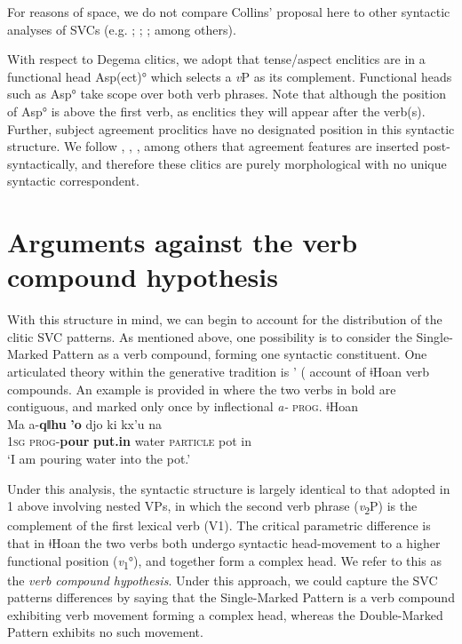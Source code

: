 \documentclass[output=paper]{langsci/langscibook}
\begin{document}
For reasons of space, we do not compare Collins’ proposal here to other syntactic analyses of SVCs (e.g. \citealt{Baker1989};  \citealt{HiraiwaBodomo2008}; \citealt{Aboh2009}; among others). 

With respect to Degema clitics, we adopt that tense/aspect enclitics are in a functional head Asp(ect)° which selects a \textit{v}P as its complement. Functional heads such as Asp° take scope over both verb phrases. Note that although the position of Asp° is above the first verb, as enclitics they will appear after the verb(s). Further, subject agreement proclitics have no designated position in this syntactic structure. We follow \citet{EmbickNoyer2007}, \citet{Kramer2010}, \citet{Norris2014}, among others that agreement features are inserted post-syntactically, and therefore these clitics are purely morphological with no unique syntactic correspondent. 

\section{Arguments against the verb compound hypothesis}
\label{bkm:Ref449523633}
With this structure in mind, we can begin to account for the distribution of the clitic SVC patterns. As mentioned above, one possibility is to consider the Single-Marked Pattern as a verb compound, forming one syntactic constituent. One articulated theory within the generative tradition is \citeauthor{Collins2002}’ (\citeyear*{collins2002} account of ǂHoan verb compounds. An example is provided in  where the two verbs in bold are contiguous, and marked only once by inflectional \textit{a-} \textsc{prog}.
\ea\label{ex:rolle:36} ǂHoan \\
\gll  Ma  a-\textbf{qǁhu}    \textbf{{\textbar}’o}    djo    ki      kx’u    na\\
     \textsc{1sg}   \textsc{prog}{}-\textbf{pour}  \textbf{put.in}  water  \textsc{particle}  pot    in\\
\glt ‘I am pouring water into the pot.’ \citep[1]{Collins2002}
\z

Under this analysis, the syntactic structure is largely identical to that adopted in 1 above involving nested VPs, in which the second verb phrase (\textit{v}\textsubscript{2}P) is the complement of the first lexical verb (V1). The critical parametric difference is that in ǂHoan the two verbs both undergo syntactic head-movement to a higher functional position (\textit{v}\textsubscript{1}°), and together form a complex head. We refer to this as the \textit{verb compound hypothesis}. Under this approach, we could capture the SVC patterns differences by saying that the Single-Marked Pattern is a verb compound exhibiting verb movement forming a complex head, whereas the Double-Marked Pattern exhibits no such movement. 
\end{document}
